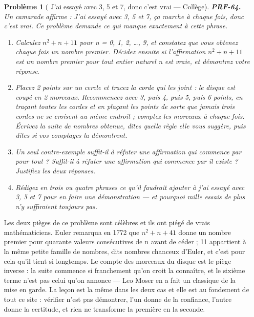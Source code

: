\documentclass[11pt]{article}
\newtheorem{problem}{Problème}
\begin{document}
\begin{problem}[{\og{} J'ai essayé avec 3, 5 et 7, donc c'est vrai \fg{} --- Collège}]
\textbf{PRF-64.} Un camarade affirme : \og{} J'ai essayé avec 3, 5 et 7, ça marche à chaque
fois, donc c'est vrai. \fg{} Ce problème demande ce qui manque exactement à cette phrase.
\begin{enumerate}
\item[(a)] Calculez $ n^2 + n + 11 $ pour n = 0, 1, 2, \dots{}, 9, et constatez que vous obtenez chaque
fois un nombre premier. Décidez ensuite si l'affirmation \og{} $ n^2 + n + 11 $ est un nombre
premier pour tout entier naturel n \fg{} est vraie, et démontrez votre réponse.
\item[(b)] Placez 2 points sur un cercle et tracez la corde qui les joint : le disque est coupé en
2 morceaux. Recommencez avec 3, puis 4, puis 5, puis 6 points, en traçant toutes les cordes
et en plaçant les points de sorte que jamais trois cordes ne se croisent au même endroit ;
comptez les morceaux à chaque fois. Écrivez la suite de nombres obtenue, dites quelle règle
elle vous suggère, puis dites si vos comptages la démontrent.
\item[(c)] Un seul contre-exemple suffit-il à réfuter une affirmation qui commence par \og{} pour
tout \fg{} ? Suffit-il à réfuter une affirmation qui commence par \og{} il existe \fg{} ? Justifiez les
deux réponses.
\item[(d)] Rédigez en trois ou quatre phrases ce qu'il faudrait ajouter à \og{} j'ai essayé avec 3, 5
et 7 \fg{} pour en faire une démonstration --- et pourquoi mille essais de plus n'y suffiraient
toujours pas.
\end{enumerate}

\end{problem}

\noindent Les deux pièges de ce problème sont célèbres et ils ont piégé de vrais
mathématiciens. Euler remarqua en 1772 que $ n^2 + n + 41 $ donne un nombre premier pour
quarante valeurs consécutives de n avant de céder ; 11 appartient à la même petite famille
de nombres, dits nombres chanceux d'Euler, et c'est pour cela qu'il tient si longtemps.
Le compte des morceaux du disque est le piège inverse : la suite commence si franchement
qu'on croit la connaître, et le sixième terme n'est pas celui qu'on annonce --- Leo Moser en
a fait un classique de la mise en garde. La leçon est la même dans les deux cas et elle est
au fondement de tout ce site : vérifier n'est pas démontrer, l'un donne de la confiance,
l'autre donne la certitude, et rien ne transforme la première en la seconde.
\end{document}
